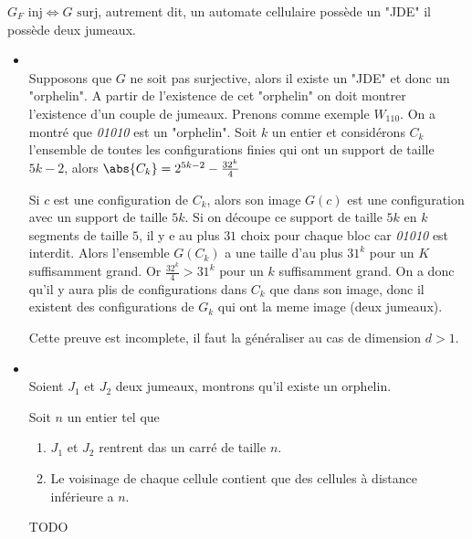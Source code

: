 \begin{theorem}
	$G_F \text{ inj} \iff G \text{ surj}$, autrement dit, un automate cellulaire possède un "JDE" \ssi il possède deux jumeaux.
\end{theorem}



\begin{proofI}
	\begin{itemize}
		\item \bimpLR\\
		      Supposons que $G$ ne soit pas surjective, alors il existe un "JDE" et donc un "orphelin".
		      A partir de l'existence de cet "orphelin" on doit montrer l'existence d'un couple de jumeaux.
		      Prenons comme exemple $W_{110}$. On a montré que \emph{01010} est un "orphelin". Soit $k$ un entier
		      et considérons $C_k$ l'ensemble de toutes les configurations finies qui ont un support de taille
		      $5k-2$, alors $\abs {C_k} = 2^{5k-2} - \frac {32^k} 4$

		      Si $c$ est une configuration de $C_k$, alors son image $G(c)$ est une configuration avec un support de taille $5k$.
		      Si on découpe ce support de taille $5k$ en $k$ segments de taille $5$, il y e au plus $31$ choix pour chaque bloc car
		      \emph{01010} est interdit. Alors l'ensemble $G(C_k)$ a une taille d'au plus $31^k$ pour un $K$ suffisamment grand.
		      Or $\frac {32^k} 4 > 31 ^ k$ pour un $k$ suffisamment grand. On a donc qu'il y aura plis de configurations
		      dans $C_k$ que dans son image, donc il existent des configurations de $G_k$ qui ont la meme image (deux jumeaux).

		      Cette preuve est incomplete, il faut la généraliser au cas de dimension $d > 1$.


		\item \bimpRL\\
		      Soient $J_1$ et $J_2$ deux jumeaux, montrons qu'il existe un orphelin.

		      Soit $n$ un entier tel que
		      \begin{enumerate}
			      \item $J_1$ et $J_2$ rentrent das un carré de taille $n$.
			      \item Le voisinage de chaque cellule contient que des cellules à distance inférieure a $n$.
		      \end{enumerate}
              TODO
	\end{itemize}
\end{proofI}

